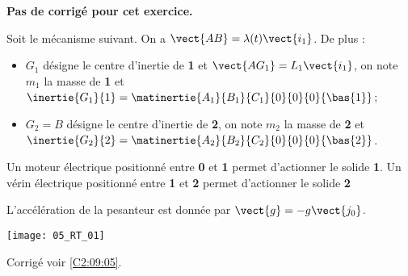 \normaltrue
\correctionfalse


\setcounter{numques}{0}
\ifcorrection
\else
\textbf{Pas de corrigé pour cet exercice.}
\fi

\ifprof
\else
Soit le mécanisme suivant. On a $\vect{AB}=\lambda(t)\vect{i_1}$. De plus :
\begin{itemize}
\item $G_1$ désigne le centre d'inertie de \textbf{1} et $\vect{AG_1}=L_1\vect{i_1}$, on note $m_1$ la masse de \textbf{1} et $\inertie{G_1}{1}=\matinertie{A_1}{B_1}{C_1}{0}{0}{0}{\bas{1}}$; 
\item $G_2=B$ désigne le centre d'inertie de \textbf{2}, on note $m_2$ la masse de \textbf{2} et $\inertie{G_2}{2}=\matinertie{A_2}{B_2}{C_2}{0}{0}{0}{\bas{2}}$.
\end{itemize}


Un moteur électrique positionné entre \textbf{0} et \textbf{1} permet d'actionner le solide \textbf{1}.
Un vérin électrique positionné entre \textbf{1} et \textbf{2} permet d'actionner le solide \textbf{2}

L'accélération de la pesanteur est donnée par $\vect{g}=-g\vect{j_0}$.

\begin{center}
\texttt{[image: 05\_RT\_01]}
\end{center}
\fi

\ifprof
\else
\fi


\ifprof
\else
\begin{flushright}
\footnotesize{Corrigé  voir \ref{C2:09:05}.}
\end{flushright}%
\fi